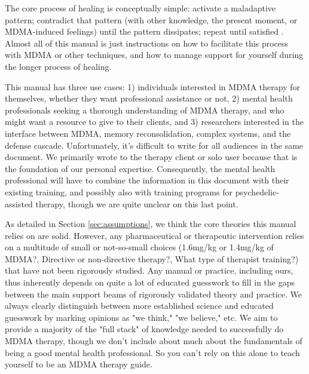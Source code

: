 \documentclass[12pt,letterpaper]{book}
\begin{document}
The core process of healing is conceptually simple: activate a maladaptive pattern; contradict that pattern (with other knowledge, the present moment, or MDMA-induced feelings) until the pattern dissipates; repeat until satisfied \cite{eckerUnlocking}. Almost all of this manual is just instructions on how to facilitate this process with MDMA or other techniques, and how to manage support for yourself during the longer process of healing.

This manual has three use cases: 1) individuals interested in MDMA therapy for themselves, whether they want professional assistance or not, 2) mental health professionals seeking a thorough understanding of MDMA therapy, and who might want a resource to give to their clients, and 3) researchers interested in the interface between MDMA, memory reconsolidation, complex systems, and the defense cascade. Unfortunately, it's difficult to write for all audiences in the same document. We primarily wrote to the therapy client or solo user because that is the foundation of our personal expertise. Consequently, the mental health professional will have to combine the information in this document with their existing training, and possibly also with training programs for psychedelic-assisted therapy, though we are quite unclear on this last point.%

As detailed in Section \ref{sec:assumptions}, we think the core theories this manual relies on are solid. However, any pharmaceutical or therapeutic intervention relies on a multitude of small or not-so-small choices (1.6mg/kg or 1.4mg/kg of MDMA?, Directive or non-directive therapy?, What type of therapist training?) that have not been rigorously studied. Any manual or practice, including ours, thus inherently depends on quite a lot of educated guesswork to fill in the gaps between the main support beams of rigorously validated theory and practice. We always clearly distinguish between more established science and educated guesswork by marking opinions as "we think," "we believe," etc. We aim to provide a majority of the "full stack" of knowledge needed to successfully do MDMA therapy, though we don't include about much about the fundamentals of being a good mental health professional. So you can't rely on this alone to teach yourself to be an MDMA therapy guide.
\end{document}
